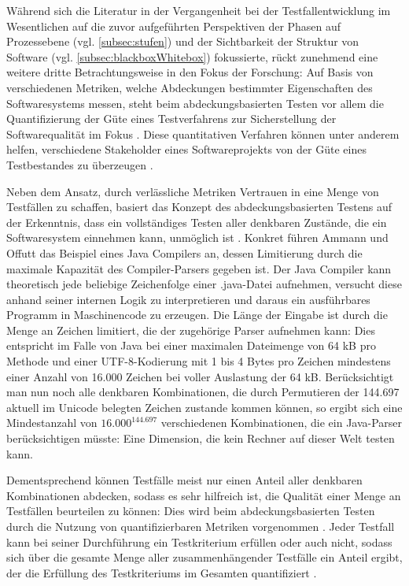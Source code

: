 Während sich die Literatur in der Vergangenheit bei der Testfallentwicklung im Wesentlichen auf die zuvor aufgeführten Perspektiven der Phasen auf Prozessebene (vgl. \autoref{subsec:stufen}) und der Sichtbarkeit der Struktur von Software (vgl. \autoref{subsec:blackboxWhitebox}) fokussierte, rückt zunehmend eine weitere dritte Betrachtungsweise in den Fokus der Forschung: Auf Basis von verschiedenen Metriken, welche Abdeckungen bestimmter Eigenschaften des Softwaresystems messen, steht beim abdeckungsbasierten Testen vor allem die Quantifizierung der Güte eines Testverfahrens zur Sicherstellung der Softwarequalität im Fokus \cite{craig2002systematic}. Diese quantitativen Verfahren können unter anderem helfen, verschiedene Stakeholder eines Softwareprojekts von der Güte eines Testbestandes zu überzeugen \cite{kuhn2010practical}.

Neben dem Ansatz, durch verlässliche Metriken Vertrauen in eine Menge von Testfällen zu schaffen, basiert das Konzept des abdeckungsbasierten Testens auf der Erkenntnis, dass ein vollständiges Testen aller denkbaren Zustände, die ein Softwaresystem einnehmen kann, unmöglich ist \cite[S. 16 f.]{ammann2008introduction}. Konkret führen Ammann und Offutt \cite[S. 16]{ammann2008introduction} das Beispiel eines Java Compilers an, dessen Limitierung durch die maximale Kapazität des Compiler-Parsers gegeben ist. Der Java Compiler kann theoretisch jede beliebige Zeichenfolge einer .java-Datei aufnehmen, versucht diese anhand seiner internen Logik zu interpretieren und daraus ein ausführbares Programm in Maschinencode zu erzeugen. Die Länge der Eingabe ist durch die Menge an Zeichen limitiert, die der zugehörige Parser aufnehmen kann: Dies entspricht im Falle von Java bei einer maximalen Dateimenge von 64 kB pro Methode \cite{deva_2021} und einer UTF-8-Kodierung mit 1 bis 4 Bytes pro Zeichen mindestens einer Anzahl von 16.000 Zeichen bei voller Auslastung der 64 kB. Berücksichtigt man nun noch alle denkbaren Kombinationen, die durch Permutieren der 144.697 aktuell im Unicode belegten Zeichen \cite{unicode} zustande kommen können, so ergibt sich eine Mindestanzahl von $16.000^{144.697}$ verschiedenen Kombinationen, die ein Java-Parser berücksichtigen müsste: Eine Dimension, die kein Rechner auf dieser Welt testen kann.

Dementsprechend können Testfälle meist nur einen Anteil aller denkbaren Kombinationen abdecken, sodass es sehr hilfreich ist, die Qualität einer Menge an Testfällen beurteilen zu können: Dies wird beim abdeckungsbasierten Testen durch die Nutzung von quantifizierbaren Metriken vorgenommen \cite[S. 17]{ammann2008introduction}. Jeder Testfall kann bei seiner Durchführung ein Testkriterium erfüllen oder auch nicht, sodass sich über die gesamte Menge aller zusammenhängender Testfälle ein Anteil ergibt, der die Erfüllung des Testkriteriums im Gesamten quantifiziert \cite[S. 17]{ammann2008introduction}. 

